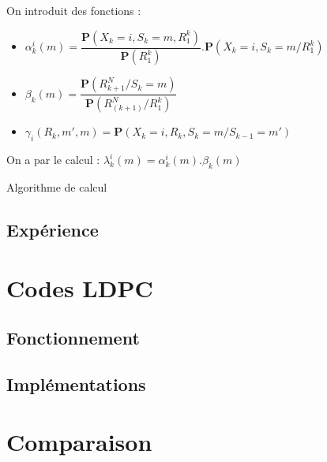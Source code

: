 \documentclass[11pt]{beamer}
\begin{document}
\begin{frame}
	On introduit des fonctions :
	\begin{itemize}
		\item $\alpha_k^i(m) = \dfrac{\mathbf{P}(X_k = i, S_k = m, R_1^k)}{\mathbf{P}(R_1^k)}.\mathbf{P}(X_k = i, S_k = m / R_1^k)$
		\item $\beta_k(m) = \dfrac{\mathbf{P}(R_{k+1}^N / S_k = m)}{\mathbf{P}(R_(k+1)^N / R_1^k)}$
		\item $\gamma_i(R_k, m', m) = \mathbf{P}(X_k = i, R_k, S_k = m/ S_{k-1} = m')$
	\end{itemize}
	On a par le calcul : $\lambda_k^i(m) = \alpha_k^i(m).\beta_k(m)$
\end{frame}

\begin{frame}{Algorithme de calcul}
	
\end{frame}

\subsection{Exp\'erience}

\section{Codes LDPC}
\subsection{Fonctionnement}
\subsection{Impl\'ementations}

\section{Comparaison}
\end{document}

